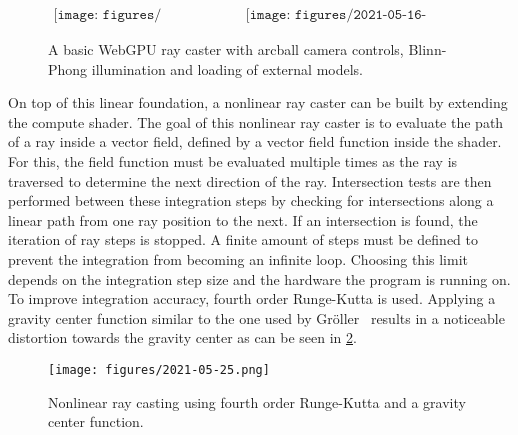 \begin{figure}[!t]
  \centering$
  \begin{array}{cc}
  \texttt{[image: figures/2021-05-16.png]} &
  \texttt{[image: figures/2021-05-16-suzanne.png]}
  \end{array}$
  \caption{A basic WebGPU ray caster with arcball camera controls, Blinn-Phong illumination and loading of external models.}
  \label{fig:linear-ray-caster}
\end{figure}

On top of this linear foundation, a nonlinear ray caster can be built by extending the compute shader.
The goal of this nonlinear ray caster is to evaluate the path of a ray inside a vector field, defined by a vector field function inside the shader.
For this, the field function must be evaluated multiple times as the ray is traversed to determine the next direction of the ray.
Intersection tests are then performed between these integration steps by checking for intersections along a linear path from one ray position to the next.
If an intersection is found, the iteration of ray steps is stopped.
A finite amount of steps must be defined to prevent the integration from becoming an infinite loop.
Choosing this limit depends on the integration step size and the hardware the program is running on.
To improve integration accuracy, fourth order Runge-Kutta is used.
Applying a gravity center function similar to the one used by Gröller~\cite{grollerNonlinearRayTracing1995} results in a noticeable distortion towards the gravity center as can be seen in \cref{fig:gravity-center}.

\begin{figure}[!t]
  \centering
  \texttt{[image: figures/2021-05-25.png]}
  \caption{Nonlinear ray casting using fourth order Runge-Kutta and a gravity center function.}
  \label{fig:gravity-center}
\end{figure}

